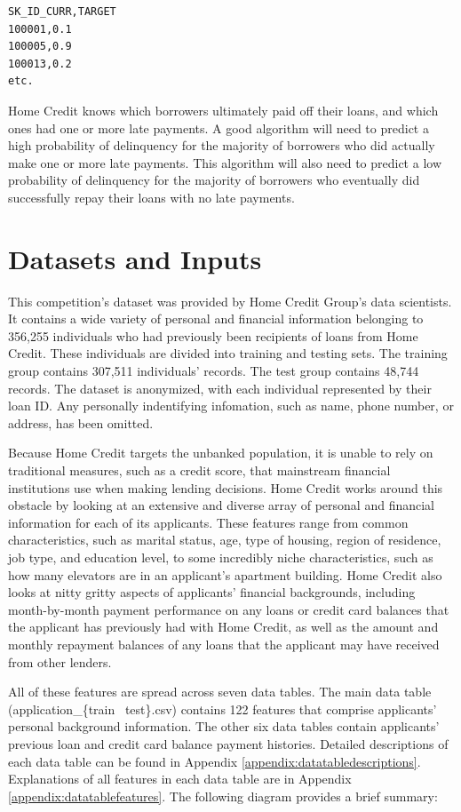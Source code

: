 \documentclass[12pt, letterpaper]{article}
\begin{document}
\begin{lstlisting}
SK_ID_CURR,TARGET
100001,0.1
100005,0.9
100013,0.2
etc.
\end{lstlisting}

Home Credit knows which borrowers ultimately paid off their loans, and which ones had one or more late payments. A good algorithm will need to predict a high probability of delinquency for the majority of borrowers who did actually make one or more late payments. This algorithm will also need to predict a low probability of delinquency for the majority of borrowers who eventually did successfully repay their loans with no late payments.

\section{Datasets and Inputs}
This competition's dataset was provided by Home Credit Group's data scientists. It contains a wide variety of personal and financial information belonging to 356,255 individuals who had previously been recipients of loans from Home Credit. These individuals are divided into training and testing sets. The training group contains 307,511 individuals' records. The test group contains 48,744 records. The dataset is anonymized, with each individual represented by their loan ID. Any personally indentifying infomation, such as name, phone number, or address, has been omitted.

Because Home Credit targets the unbanked population, it is unable to rely on traditional measures, such as a credit score, that mainstream financial institutions use when making lending decisions. Home Credit works around this obstacle by looking at an extensive and diverse array of personal and financial information for each of its applicants. These features range from common characteristics, such as marital status, age, type of housing, region of residence, job type, and education level, to some incredibly niche characteristics, such as how many elevators are in an applicant's apartment building. Home Credit also looks at nitty gritty aspects of applicants' financial backgrounds, including month-by-month payment performance on any loans or credit card balances that the applicant has previously had with Home Credit, as well as the amount and monthly repayment balances of any loans that the applicant may have received from other lenders.

All of these features are spread across seven data tables. The main data table (application_\{train \textbar~test\}.csv) contains 122 features that comprise applicants' personal background information. The other six data tables contain applicants' previous loan and credit card balance payment histories. Detailed descriptions of each data table can be found in Appendix \ref{appendix:datatabledescriptions}. Explanations of all features in each data table are in Appendix \ref{appendix:datatablefeatures}. The following diagram provides a brief summary:
\end{document}
